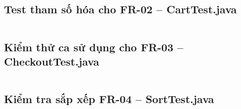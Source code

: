 \documentclass[12pt,a4paper]{article}
\begin{document}
\medskip
{}
\label{lst:logintest}
\vspace{-2pt}
\inputminted[frame=lines, framesep=2mm, rulecolor=black!40, bgcolor=black!3, linenos, numbersep=6pt, breaklines=true, breakautoindent=true, fontsize=\scriptsize, tabsize=4]{java}{../automation/src/test/java/vn/edu/softwaretesting/tests/LoginTest.java}


\subsection{Test tham số hóa cho FR-02 -- CartTest.java}

\medskip
{}
\label{lst:carttest}
\vspace{-2pt}
\inputminted[frame=lines, framesep=2mm, rulecolor=black!40, bgcolor=black!3, linenos, numbersep=6pt, breaklines=true, breakautoindent=true, fontsize=\scriptsize, tabsize=4]{java}{../automation/src/test/java/vn/edu/softwaretesting/tests/CartTest.java}



\subsection{Kiểm thử ca sử dụng cho FR-03 -- CheckoutTest.java}

\medskip
{}
\label{lst:checkouttest}
\vspace{-2pt}
\inputminted[frame=lines, framesep=2mm, rulecolor=black!40, bgcolor=black!3, linenos, numbersep=6pt, breaklines=true, breakautoindent=true, fontsize=\scriptsize, tabsize=4]{java}{../automation/src/test/java/vn/edu/softwaretesting/tests/CheckoutTest.java}



\subsection{Kiểm tra sắp xếp FR-04 -- SortTest.java}

\medskip
{}
\label{lst:sorttest}
\vspace{-2pt}
\inputminted[frame=lines, framesep=2mm, rulecolor=black!40, bgcolor=black!3, linenos, numbersep=6pt, breaklines=true, breakautoindent=true, fontsize=\scriptsize, tabsize=4]{java}{../automation/src/test/java/vn/edu/softwaretesting/tests/SortTest.java}
\end{document}
